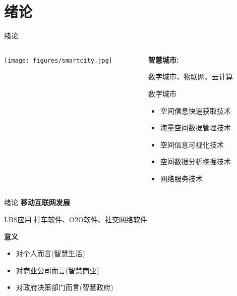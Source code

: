\section{绪论}

\begin{frame}{绪论}
    \begin{columns}
        \begin{column}{0.5\textwidth}
        \texttt{[image: figures/smartcity.jpg]}
        \end{column}

        \begin{column}{0.5\textwidth}
        \textbf{智慧城市:} 
        
        数字城市、物联网、云计算
        \vspace{2em}

        \pause
        \alert{数字城市}
        \begin{itemize}
        \item 空间信息快速获取技术
        \item 海量空间数据管理技术
        \item 空间信息可视化技术
        \item 空间数据分析挖掘技术
        \item 网络服务技术
        \end{itemize}
        \end{column}
   \end{columns}
\end{frame}

\begin{frame}{绪论}
    \textbf{移动互联网发展}

    \alert{LBS应用}
    打车软件、O2O软件、社交网络软件

    \vspace{2em}
    \pause
    \textbf{意义}
    \begin{itemize}
        \pause
        \item 对个人而言(智慧生活)
        \pause
        \item 对商业公司而言(智慧商业)
        \pause
        \item 对政府决策部门而言(智慧政府)
    \end{itemize}
\end{frame}

